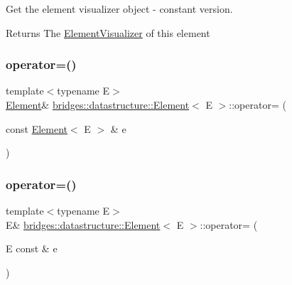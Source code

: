 Get the element visualizer object -\/ constant version. 

\begin{DoxyReturn}{Returns}
The \hyperlink{classbridges_1_1datastructure_1_1_element_visualizer}{Element\+Visualizer} of this element 
\end{DoxyReturn}
\mbox{\label{classbridges_1_1datastructure_1_1_element_a6446ad27ba42a854ff93b74b4d7eb3cb}} 
\subsubsection{\texorpdfstring{operator=()}{operator=()}\hspace{0.1cm}{\footnotesize\ttfamily [1/2]}}
{\footnotesize\ttfamily template$<$typename E$>$ \\
\hyperlink{classbridges_1_1datastructure_1_1_element}{Element}\& \hyperlink{classbridges_1_1datastructure_1_1_element}{bridges\+::datastructure\+::\+Element}$<$ E $>$\+::operator= (\begin{DoxyParamCaption}\item[{const \hyperlink{classbridges_1_1datastructure_1_1_element}{Element}$<$ E $>$ \&}]{e }\end{DoxyParamCaption})\hspace{0.3cm}{\ttfamily [inline]}}

\mbox{\label{classbridges_1_1datastructure_1_1_element_a18ffc753328275e95bb1ee967f88a00a}} 
\subsubsection{\texorpdfstring{operator=()}{operator=()}\hspace{0.1cm}{\footnotesize\ttfamily [2/2]}}
{\footnotesize\ttfamily template$<$typename E$>$ \\
E\& \hyperlink{classbridges_1_1datastructure_1_1_element}{bridges\+::datastructure\+::\+Element}$<$ E $>$\+::operator= (\begin{DoxyParamCaption}\item[{E const \&}]{e }\end{DoxyParamCaption})\hspace{0.3cm}{\ttfamily [inline]}}

